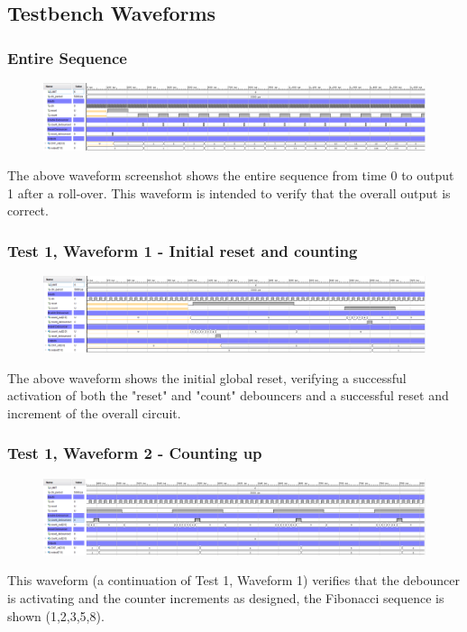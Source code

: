 \documentclass[11pt]{report}
\begin{document}
\subsection*{Testbench Waveforms}

\subsubsection*{Entire Sequence}
\begin{figure}[H]
    \includegraphics[width=\columnwidth]{Reports/Lab1/Waveforms/01_entire-sequence.png}
\end{figure}
The above waveform screenshot shows the entire sequence from time 0 to output 1 after a roll-over. This waveform is intended to verify that the overall output is correct.

\subsubsection*{Test 1, Waveform 1 - Initial reset and counting}
\begin{figure}[H]
    \includegraphics[width=\columnwidth]{Reports/Lab1/Waveforms/02_initial-reset-and-counting.png}
\end{figure}
The above waveform shows the initial global reset, verifying a successful activation of both the "reset" and "count" debouncers and a successful reset and increment of the overall circuit. 

\subsubsection*{Test 1, Waveform 2 - Counting up}
\begin{figure}[H]
    \includegraphics[width=\columnwidth]{Reports/Lab1/Waveforms/03_counting-up.png}
\end{figure}
This waveform (a continuation of Test 1, Waveform 1) verifies that the debouncer is activating and the counter increments as designed, the Fibonacci sequence is shown (1,2,3,5,8).
\end{document}
